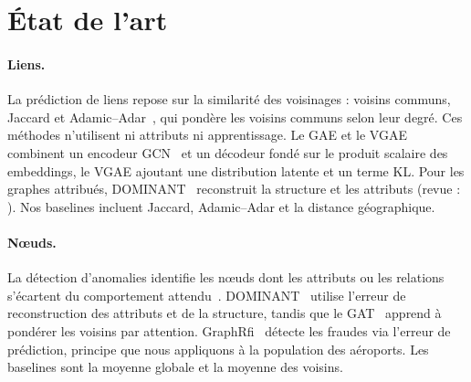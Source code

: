 \section{État de l'art}
\label{sec:sota}

\paragraph{Liens.}
La prédiction de liens repose sur la similarité des voisinages : voisins communs, Jaccard et Adamic--Adar~\cite{adamic2003friends,liben2007link}, qui pondère les voisins communs selon leur degré. Ces méthodes n'utilisent ni attributs ni apprentissage. Le GAE et le VGAE~\cite{kipf2016vgae} combinent un encodeur GCN~\cite{kipf2017gcn} et un décodeur fondé sur le produit scalaire des embeddings, le VGAE ajoutant une distribution latente et un terme KL. Pour les graphes attribués, DOMINANT~\cite{ding2019dominant} reconstruit la structure et les attributs (revue : \cite{ma2023survey}). Nos baselines incluent Jaccard, Adamic--Adar et la distance géographique.

\paragraph{Nœuds.}
La détection d'anomalies identifie les nœuds dont les attributs ou les relations s'écartent du comportement attendu~\cite{ma2023survey}. DOMINANT~\cite{ding2019dominant} utilise l'erreur de reconstruction des attributs et de la structure, tandis que le GAT~\cite{velickovic2018gat} apprend à pondérer les voisins par attention. GraphRfi~\cite{zhang2020graphrfi} détecte les fraudes via l'erreur de prédiction, principe que nous appliquons à la population des aéroports. Les baselines sont la moyenne globale et la moyenne des voisins.

